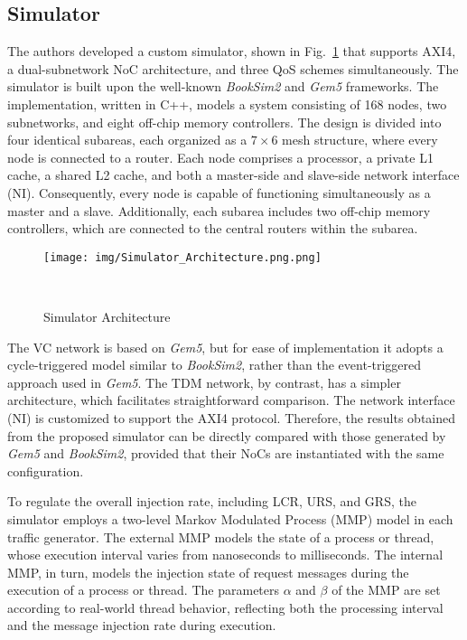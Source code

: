 \subsection{Simulator}
The authors developed a custom simulator, shown in Fig.~\ref{fig:simulator_architecture} that supports AXI4, a dual-subnetwork NoC architecture, and three QoS schemes simultaneously. The simulator is built upon the well-known \textit{BookSim2} and \textit{Gem5} frameworks.
The implementation, written in C++, models a system consisting of 168 nodes, two subnetworks, and eight off-chip memory controllers. The design is divided into four identical subareas, each organized as a $7 \times 6$ mesh structure, where every node is connected to a router.
Each node comprises a processor, a private L1 cache, a shared L2 cache, and both a master-side and slave-side network interface (NI). Consequently, every node is capable of functioning simultaneously as a master and a slave. Additionally, each subarea includes two off-chip memory controllers, which are connected to the central routers within the subarea.

\begin{figure}[htbp]
    \centering
    \texttt{[image: img/Simulator\_Architecture.png.png]}
    \caption{Simulator Architecture}~\cite{abderazek_multicore_2013}\label{fig:simulator_architecture}
\end{figure}

The VC network is based on \textit{Gem5}, but for ease of implementation it adopts a cycle-triggered model similar to \textit{BookSim2}, rather than the event-triggered approach used in \textit{Gem5}. The TDM network, by contrast, has a simpler architecture, which facilitates straightforward comparison. 
The network interface (NI) is customized to support the AXI4 protocol. 
Therefore, the results obtained from the proposed simulator can be directly compared with those generated by \textit{Gem5} and \textit{BookSim2}, provided that their NoCs are instantiated with the same configuration.

To regulate the overall injection rate, including LCR, URS, and GRS, the simulator employs a two-level Markov Modulated Process (MMP) model in each traffic generator. The external MMP models the state of a process or thread, whose execution interval varies from nanoseconds to milliseconds. The internal MMP, in turn, models the injection state of request messages during the execution of a process or thread. The parameters $\alpha$ and $\beta$ of the MMP are set according to real-world thread behavior, reflecting both the processing interval and the message injection rate during execution. 

